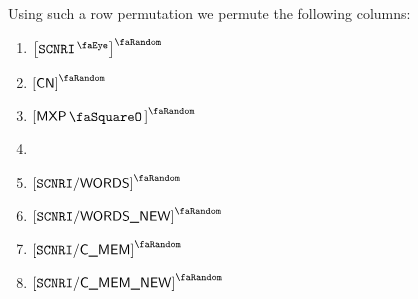 Using such a row permutation we permute the following columns:
\begin{multicols}{2}
	\begin{enumerate}
		\item $\order{\isMxpScenario       }$
		\item $\order{\cn                  }$
		\item $\order{\mxpStamp            }$
		\item[\vspace{\fill}]
		\item $\order{\mxpScenarioWords    }$
		\item $\order{\mxpScenarioWordsNew }$
		\item $\order{\mxpScenarioCmem     }$
		\item $\order{\mxpScenarioCmemNew  }$
	\end{enumerate}
\end{multicols}
